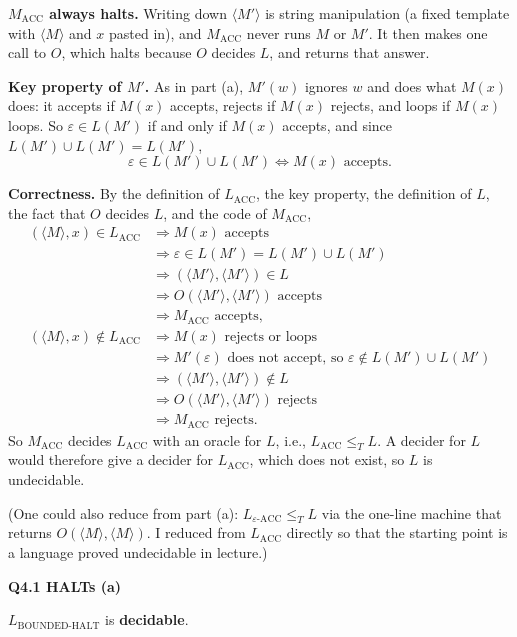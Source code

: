 \documentclass[11pt]{article}
\newcommand{\inner}[1]{\langle #1 \rangle}
\newcommand{\lT}{\leq_T}
\newcommand{\Lacc}{L_{\text{ACC}}}
\newcommand{\Leacc}{L_{\varepsilon\text{-ACC}}}
\newcommand{\Lbh}{L_{\text{BOUNDED-HALT}}}
\newcommand{\qpage}[1]{\clearpage\noindent\textbf{\large #1}\par\medskip}
\begin{document}
\textbf{$M_{\text{ACC}}$ always halts.}
Writing down $\inner{M'}$ is string manipulation (a fixed template with $\inner{M}$ and $x$ pasted in), and $M_{\text{ACC}}$ never runs $M$ or $M'$.
It then makes one call to $O$, which halts because $O$ decides $L$, and returns that answer.

\textbf{Key property of $M'$.}
As in part (a), $M'(w)$ ignores $w$ and does what $M(x)$ does: it accepts if $M(x)$ accepts, rejects if $M(x)$ rejects, and loops if $M(x)$ loops.
So $\varepsilon \in L(M')$ if and only if $M(x)$ accepts, and since $L(M') \cup L(M') = L(M')$,
\[
  \varepsilon \in L(M') \cup L(M') \iff M(x) \text{ accepts}.
\]

\textbf{Correctness.}
By the definition of $\Lacc$, the key property, the definition of $L$, the fact that $O$ decides $L$, and the code of $M_{\text{ACC}}$,
\begin{align*}
  (\inner{M}, x) \in \Lacc &\Longrightarrow M(x) \text{ accepts} \\
  &\Longrightarrow \varepsilon \in L(M') = L(M') \cup L(M') \\
  &\Longrightarrow (\inner{M'}, \inner{M'}) \in L \\
  &\Longrightarrow O(\inner{M'}, \inner{M'}) \text{ accepts} \\
  &\Longrightarrow M_{\text{ACC}} \text{ accepts}, \\[0.5em]
  (\inner{M}, x) \notin \Lacc &\Longrightarrow M(x) \text{ rejects or loops} \\
  &\Longrightarrow M'(\varepsilon) \text{ does not accept, so } \varepsilon \notin L(M') \cup L(M') \\
  &\Longrightarrow (\inner{M'}, \inner{M'}) \notin L \\
  &\Longrightarrow O(\inner{M'}, \inner{M'}) \text{ rejects} \\
  &\Longrightarrow M_{\text{ACC}} \text{ rejects}.
\end{align*}
So $M_{\text{ACC}}$ decides $\Lacc$ with an oracle for $L$, i.e., $\Lacc \lT L$.
A decider for $L$ would therefore give a decider for $\Lacc$, which does not exist, so $L$ is undecidable.

(One could also reduce from part (a): $\Leacc \lT L$ via the one-line machine that returns $O(\inner{M}, \inner{M})$.
I reduced from $\Lacc$ directly so that the starting point is a language proved undecidable in lecture.)

\qpage{Q4.1 HALTs (a)}

$\Lbh$ is \textbf{decidable}.
\end{document}
